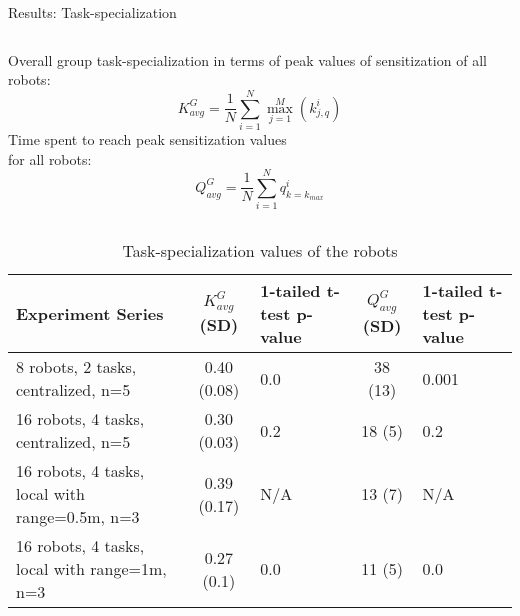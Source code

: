 \documentclass{beamer}
\begin{document}
\begin{frame}[t]{Results: Task-specialization}
\begin{small}
\begin{columns}
\alert{Overall group task-specialization} in terms of peak values of sensitization of all robots:
\vspace*{-0.25cm}
\begin{equation}
K^G_{avg} = \frac{1}{N}\sum_{i=1}^{N} \max_{j=1}^M\left ( k^i_{j, q} \right ) 
\label{eqn:K-G}
\end{equation}
\alert{Time spent to reach peak sensitization values}\\ for all robots:
\vspace*{-0.25cm}
\begin{equation}
Q^G_{avg}= \frac{1}{N}\sum_{i=1}^{N} q^i_{k=k_{max}}
\label{eqn:Q-G}
\end{equation}
\end{columns}
\end{small}
\vspace*{-0.25cm}
\begin{table}
\begin{scriptsize}
\begin{center}
\caption{\scriptsize Task-specialization values of the robots}
\begin{tabular}{|m{1.2in}|c|m{0.6in}|c|m{0.6in}|}
\hline Experiment Series & $ K^G_{avg}$ (SD) &  1-tailed t-test p-value & $ Q^G_{avg}$ (SD) & 1-tailed t-test p-value \\ 
\hline 8 robots, 2 tasks, centralized, n=5 & 0.40 (0.08)& 0.0 & 38 (13) & 0.001\\ 
\hline 16 robots, 4 tasks, centralized, n=5 & 0.30 (0.03) & 0.2 &  18 (5) & 0.2 \\
\hline 16 robots, 4 tasks, local  with range=0.5m, n=3  & 0.39 (0.17) & N/A & 13 (7) & N/A \\
\hline 16 robots, 4 tasks, local  with range=1m, n=3  & 0.27 (0.1)& 0.0 & 11 (5) & 0.0\\
\hline
\end{tabular}
\label{table:motion-cmp} 
\end{center}
\end{scriptsize}
\end{table}
\end{frame}
\end{document}
